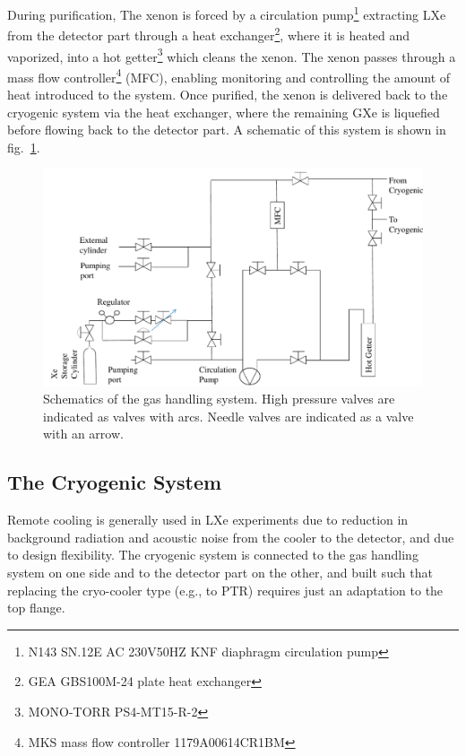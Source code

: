 During purification, The xenon is forced by a circulation pump\footnote{N143 SN.12E AC 230V50HZ KNF diaphragm circulation pump} extracting LXe from the detector part through a heat exchanger\footnote{GEA GBS100M-24 plate heat exchanger},
where it is heated and vaporized, into a hot getter\footnote{MONO-TORR PS4-MT15-R-2} which cleans the xenon. The xenon passes through a mass flow controller\footnote{MKS mass flow controller 1179A00614CR1BM} (MFC), 
enabling monitoring and controlling the amount of heat introduced to the system.  Once purified, the xenon is delivered back to the cryogenic system 
via the heat exchanger, where the remaining GXe is 
liquefied before flowing back to the detector part. A schematic of this 
system is shown in fig.~\ref{fig:gasSchematic}.


\begin{figure}[h]
\centerline{\includegraphics[width=0.75\linewidth]{GasSchematics.png}}
\caption{Schematics of the gas handling system. High pressure valves are indicated as 
valves with arcs. Needle valves are indicated as 
a valve with an arrow.
\label{fig:gasSchematic}}
\end{figure}


\subsection{The Cryogenic System}
\label{subsec:cryo}

Remote cooling is generally used in LXe experiments due to reduction in background radiation and acoustic noise from the cooler to the detector, and due to design flexibility. The cryogenic system is connected to the gas handling system on 
one side and to the detector part on the other, and built such that replacing the cryo-cooler type (e.g., to PTR) requires just an adaptation to the top flange.


